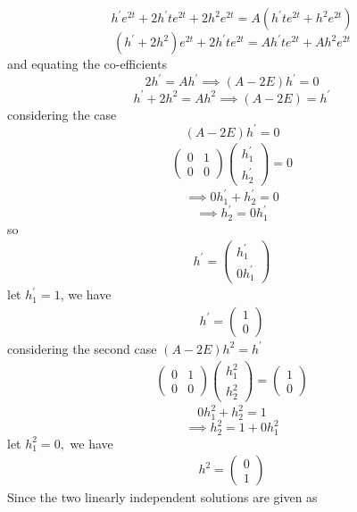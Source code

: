 \documentclass[a4paper, 12pt]{article}
\begin{document}
$$ h^\prime e^{2t} + 2h^\prime te^{2t} + 2h^2e^{2t} = A (h^\prime te^{2t} + h^2e^{2t}) $$
$$ (h^\prime + 2h^2)e^{2t} + 2h^\prime te^{2t} = Ah^\prime te^{2t} + Ah^2e^{2t} $$ and equating the co-efficients \\
$$ 2h^\prime = Ah^\prime \implies (A-2E)h^\prime = 0 $$
$$ h^\prime + 2h^2 = Ah^2 \implies (A-2E)= h^\prime$$
considering the case\\
$$ (A-2E)h^\prime = 0 $$
\begin{align*}
\begin{pmatrix}
0 & 1 \\
0 & 0
\end{pmatrix} \begin{pmatrix}
h_1^\prime \\
h_2^\prime
\end{pmatrix} = 0 
\end{align*}
$$ \implies 0h_1^\prime + h_2^\prime = 0 $$
$$ \implies  h_2^\prime = 0h_1^\prime $$
so 
\begin{align*}
h^\prime =
\begin{pmatrix}
h_1^\prime\\
0h_1^\prime
\end{pmatrix}
\end{align*}
let $ h_1^\prime = 1 $, we have 
\begin{align*}
h^\prime =
\begin{pmatrix}
1\\
0
\end{pmatrix}
\end{align*}
considering the second case
$ (A-2E)h^2 = h^\prime $
\begin{align*}
\begin{pmatrix}
0 & 1\\
0 & 0
\end{pmatrix}
\begin{pmatrix}
h_1^2 \\
h_2^2
\end{pmatrix} = 
\begin{pmatrix}
1 \\
0
\end{pmatrix}
\end{align*}
$$ 0h_1^2 + h_2^2  = 1 $$
$$ \implies h_2^2 = 1 + 0h_1^2 $$
let $h_1^2 = 0, $ we have
\begin{align*}
h^2 =
\begin{pmatrix}
0 \\
1 
\end{pmatrix}
\end{align*}
Since the two linearly independent solutions are given as 
\end{document}
